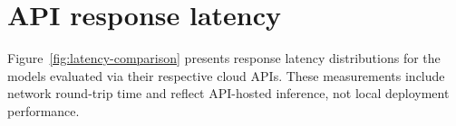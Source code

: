 
\section{API response latency} \label{app:latency}
\setcounter{table}{0}
\setcounter{figure}{0}

Figure~\ref{fig:latency-comparison} presents response latency distributions
for the models evaluated via their respective cloud APIs. These measurements
include network round-trip time and reflect API-hosted inference, not local
deployment performance.

